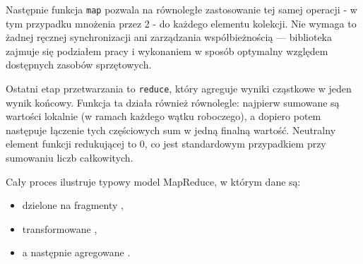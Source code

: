 Następnie funkcja \texttt{map} pozwala na równoległe zastosowanie tej samej operacji - w tym przypadku mnożenia przez 2 - do każdego elementu kolekcji. Nie wymaga to żadnej ręcznej synchronizacji ani zarządzania współbieżnością — biblioteka zajmuje się podziałem pracy i wykonaniem w sposób optymalny względem dostępnych zasobów sprzętowych.

Ostatni etap przetwarzania to \texttt{reduce}, który agreguje wyniki cząstkowe w jeden wynik końcowy. Funkcja ta działa również równolegle: najpierw sumowane są wartości lokalnie (w ramach każdego wątku roboczego), a dopiero potem następuje łączenie tych częściowych sum w jedną finalną wartość. Neutralny element funkcji redukującej to 0, co jest standardowym przypadkiem przy sumowaniu liczb całkowitych.

Cały proces ilustruje typowy model MapReduce, w którym dane są:
\begin{itemize}
\item dzielone na fragmenty ,
\item transformowane ,
\item a następnie agregowane .
\end{itemize}